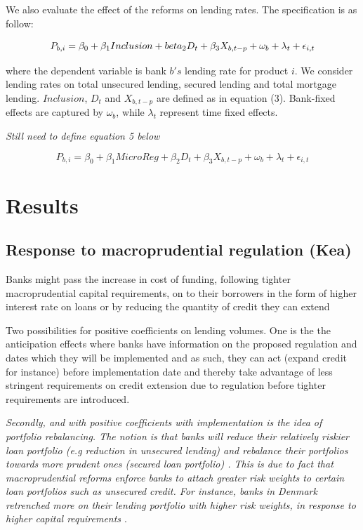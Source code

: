 \documentclass[
  letterpaper,
  DIV=11,
  numbers=noendperiod]{scrartcl}
\begin{document}
We also evaluate the effect of the reforms on lending rates. The
specification is as follow:

\begin{equation}
    P_{b,i}= \beta_{0}+\beta_{1}Inclusion+ \\beta_{2}D_{t}+\beta_{3}X_{b,t-p}+ \omega_{b}+ \lambda_{t}+\epsilon_{i,t}
\end{equation}

where the dependent variable is bank \(b's\) lending rate for product
\(i\). We consider lending rates on total unsecured lending, secured
lending and total mortgage lending. \(Inclusion\), \(D_{t}\) and
\(X_{b,t-p}\) are defined as in equation (3). Bank-fixed effects are
captured by \(\omega_{b}\), while \(\lambda_{t}\) represent time fixed
effects.

\textit{Still need to define equation 5 below}

\begin{equation}
    P_{b,i}= \beta_{0}+\beta_{1}MicroReg+ \beta_{2}D_{t}+\beta_{3}X_{b,t-p}+ \omega_{b}+ \lambda_{t}+\epsilon_{i,t}
\end{equation}

\section{Results}\label{results}

\subsection{Response to macroprudential regulation
(Kea)}\label{response-to-macroprudential-regulation-kea}

Banks might pass the increase in cost of funding, following tighter
macroprudential capital requirements, on to their borrowers in the form
of higher interest rate on loans or by reducing the quantity of credit
they can extend \citep{noss2016estimating}

Two possibilities for positive coefficients on lending volumes. One is
the the anticipation effects where banks have information on the
proposed regulation and dates which they will be implemented and as
such, they can act (expand credit for instance) before implementation
date and thereby take advantage of less stringent requirements on credit
extension due to regulation before tighter requirements are introduced.

\textit{Secondly, and with positive coefficients with implementation is the idea of portfolio rebalancing. The notion is that banks will reduce their relatively riskier loan portfolio (e.g reduction in unsecured lending) and rebalance their portfolios towards more prudent ones (secured loan portfolio) \citep{deli2017real}. This is due to fact that macroprudential reforms enforce banks to attach greater risk weights to certain loan portfolios such as unsecured credit. For instance, banks in Denmark retrenched more on their lending portfolio with higher risk weights, in response to higher capital requirements \citep{imbierowicz2018time}}.
\end{document}
